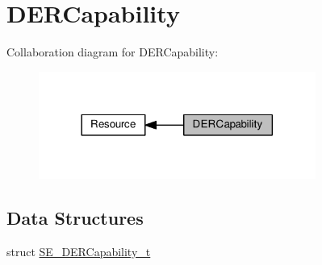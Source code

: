 \hypertarget{group__DERCapability}{}\section{D\+E\+R\+Capability}
\label{group__DERCapability}
Collaboration diagram for D\+E\+R\+Capability\+:\nopagebreak
\begin{figure}[H]
\begin{center}
\leavevmode
\includegraphics[width=257pt]{group__DERCapability}
\end{center}
\end{figure}
\subsection*{Data Structures}
\begin{DoxyCompactItemize}
\item 
struct \hyperlink{structSE__DERCapability__t}{S\+E\+\_\+\+D\+E\+R\+Capability\+\_\+t}
\end{DoxyCompactItemize}
